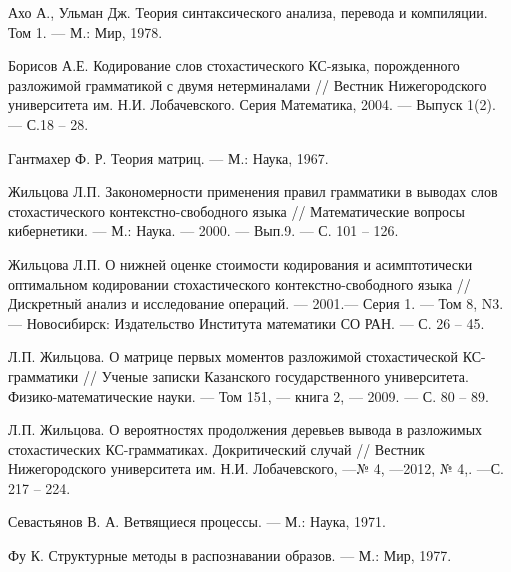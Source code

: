 \documentclass[%
11pt,a4paper]{article}
\begin{document}
{{\begin{thebibliography}{8}
 Ахо А., Ульман Дж. Теория синтаксического анализа,
перевода и компиляции. Том 1. --- М.: Мир, 1978.

 Борисов А.Е. Кодирование слов стохастического КС-языка, порожденного разложимой грамматикой
с двумя нетерминалами // Вестник Нижегородского университета им. Н.И. Лобачевского. Серия Математика, 2004. --- Выпуск 1(2). --- С.18 -- 28.

 Гантмахер Ф. Р. Теория матриц. --- М.: Наука, 1967.

 Жильцова Л.П. Закономерности применения правил грамматики
в выводах слов стохастического контекстно-свободного языка //
Математические вопросы кибернетики. --- М.: Наука. --- 2000. --- Вып.9.
--- С. 101 -- 126.

 Жильцова Л.П. О нижней оценке стоимости кодирования и
асимптотически оптимальном кодировании стохастического
контекстно-свободного языка // Дискретный анализ и исследование операций.
--- 2001.--- Серия 1. --- Том 8, N3. ---
Новосибирск: Издательство Института математики СО РАН. --- С. 26 -- 45.

 Л.П. Жильцова. О матрице первых моментов разложимой стохастической КС-грамматики // Ученые записки Казанского государственного университета. Физико-математические науки. --- Том 151, --- книга 2, --- 2009. --- С. 80 -- 89.

 Л.П. Жильцова. О вероятностях продолжения деревьев вывода в разложимых стохастических КС-грамматиках. Докритический случай // Вестник Нижегородского университета им. Н.И. Лобачевского,  ---№ 4, ---2012, № 4,. ---С. 217 -- 224.

 Севастьянов В. А. Ветвящиеся процессы. --- М.: Наука, 1971.

 Фу К. Структурные методы в распознавании образов.
--- М.: Мир, 1977.

\end{thebibliography}

}
}
\end{document}
